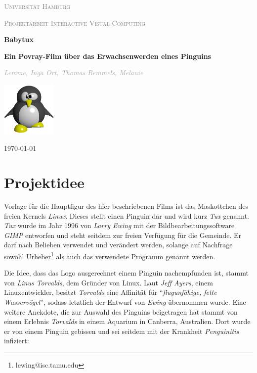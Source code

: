 \documentclass[11pt,parskip]{scrartcl}
\begin{document}
%
\begin{titlepage}
  \begin{sffamily}
    {\scshape\LARGE \textcolor{gray}{Universität Hamburg}\par}
    {\scshape\Large \textcolor{gray}{Projektarbeit Interactive Visual
        Computing}\par}
    \vspace{2.5cm}
    \centering
    {\huge\bfseries Babytux\par}
    {\large\bfseries Ein Povray-Film über das Erwachsenwerden eines Pinguins\par}
    \vspace{1.5cm}
    {\Large\itshape \textcolor{darkgray}{
        Lemme, Inga \quad{}
        Ort, Thomas \quad{}
        Remmels, Melanie
      }\par
    }
    \vfill
    \includegraphics[width=0.20\textwidth]{./fig/ourtux.pdf}\par\vspace{1cm}
    \vfill
    {\large \today\par}
  \end{sffamily}
\end{titlepage}
%


\newpage
\tableofcontents
\newpage


\section{Projektidee}
Vorlage für die Hauptfigur des hier beschriebenen Films ist das Maskottchen des
freien Kernels \emph{Linux}. Dieses stellt einen Pinguin dar und wird kurz
\emph{Tux} genannt. \emph{Tux} wurde im Jahr 1996 von \emph{Larry Ewing} mit
der Bildbearbeitungssoftware \emph{GIMP} entworfen und steht seitdem zur freien
Verfügung für die Gemeinde. Er darf nach Belieben verwendet und verändert
werden, solange auf Nachfrage sowohl Urheber\footnote{lewing@isc.tamu.edu} als
auch das verwendete Programm genannt werden. \cite{ewing}

Die Idee, dass das Logo ausgerechnet einem Pinguin nachempfunden ist, stammt
von \emph{Linus Torvalds}, dem Gründer von Linux. Laut \emph{Jeff Ayers}, einem
Linuxentwickler, besitzt \emph{Torvalds} eine Affinität für
\enquote{\emph{flugunfähige, fette Wasservögel}}, sodass letztlich der Entwurf
von \emph{Ewing} übernommen wurde. Eine weitere Anekdote, die zur Auswahl des
Pinguins beigetragen hat stammt von einem Erlebnis \emph{Torvalds} in einem
Aquarium in Canberra, Australien. Dort wurde er von einem Pinguin gebissen und
sei seitdem mit der Krankheit \emph{Penguinitis} infiziert:
\end{document}

